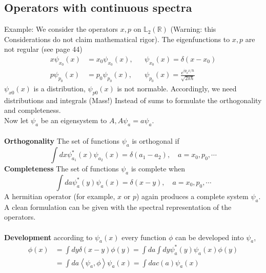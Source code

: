 \subsection{Operators with continuous spectra}
Example: We consider the operators $x, p$ on $\mathbb{L}_2(\mathbb{R})$ (Warning: this
Considerations do not claim mathematical rigor).
The eigenfunctions to $x, p$ are not regular (see page 44)
\begin{equation}
\begin{aligned} x \psi_{x_{0}}(x) &=x_{0} \psi_{x_{0}}(x), & & \psi_{x_{0}}(x)=\delta\left(x-x_{0}\right) \\ p \psi_{p_{0}}(x) &=p_{0} \psi_{p_{0}}(x), & & \psi_{p_{0}}(x)=\frac{e^{i p_{0} x / \hbar}}{\sqrt{2 \pi \hbar}} \end{aligned}
\end{equation}
$\psi_{x0}(x)$ is a distribution, $\psi_{p0}(x)$ is not normable. Accordingly, we need distributions and integrals (Mass!) Instead of sums to formulate the orthogonality and completeness.\\
Now let {$\psi_a$} be an eigensystem to $A,A\psi_a=a\psi_a$.\\\\
\textbf{Orthogonality} The set of functions {$\psi_a$} is orthogonal if
\begin{equation}
    \int d x \psi_{a_{1}}^{*}(x) \psi_{a_{2}}(x)=\delta\left(a_{1}-a_{2}\right), \quad a=x_{0}, p_{0}, \cdots
    \end{equation}
\textbf{Completeness} The set of functions {$\psi_a$} is complete when
\begin{equation}
    \int d a \psi_{a}^{*}(y) \psi_{a}(x)=\delta(x-y), \quad a=x_{0}, p_{0}, \cdots
    \end{equation}
A hermitian operator (for example, $x$ or $p$) again produces a complete system {$\psi_a$}. A clean formulation can be given with the spectral representation of the operators.\\\\
\textbf{Development} according to $\psi_a(x)$ every function $\phi$ can be developed into {$\psi_a$},
\begin{equation}
\begin{aligned} \phi(x) &=\int d y \delta(x-y) \phi(y)=\int d a \int d y \psi_{a}^{*}(y) \psi_{a}(x) \phi(y) \\ &=\int d a\left\langle\psi_{a}, \phi\right\rangle \psi_{a}(x)=\int d a c(a) \psi_{a}(x) \end{aligned}
\end{equation}
